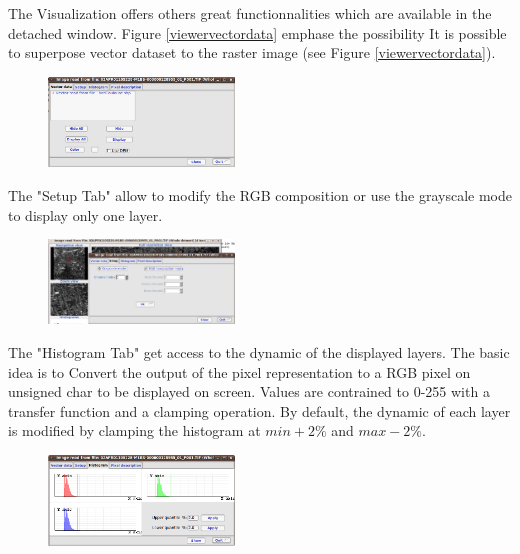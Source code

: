 The Visualization offers others great functionnalities which are available in the detached window.
Figure \ref{viewervectordata} emphase the possibility It is possible to superpose vector dataset
to the raster image (see Figure \ref{viewervectordata}).

\begin{figure}
   \center
   \includegraphics[width=0.44\textwidth]{../Art/MonteverdiImages/monteverdi_viewer_vector_data.png}
   \label{fig:viewervectordata}
\end{figure}

The "Setup Tab" allow to modify the RGB composition or use the grayscale mode to display only one layer. 

\begin{figure}
   \center
   \includegraphics[width=0.44\textwidth]{../Art/MonteverdiImages/monteverdi_viewer_rgb_composition.png}
   \label{fig:rgbcomposition}
\end{figure}

The "Histogram Tab" get access to the dynamic of the displayed layers. The basic idea is to Convert the output of the 
pixel representation to a RGB pixel on unsigned char to be displayed on screen. 
Values are contrained to 0-255 with a transfer function and a clamping operation.
By default, the dynamic of each layer is modified by
clamping the histogram at $min + 2\%$ and $max - 2\%$. 

\begin{figure}
   \center
   \includegraphics[width=0.44\textwidth]{../Art/MonteverdiImages/monteverdi_viewer_histogram.png}
   \label{fig:histogram}
\end{figure}

